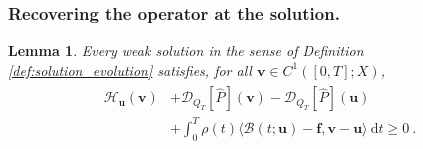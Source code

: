 \documentclass{article}
\newtheorem{lemma}[theorem]{Lemma}
\theoremstyle{definition}
\newcommand{\bfu}{\boldsymbol{u}}
\newcommand{\bfv}{\boldsymbol{v}}
\newcommand{\bff}{\boldsymbol{f}}
\newcommand{\D}{\mathcal{D}}
\newcommand{\dd}{\:\mathrm{d}}
\newcommand{\B}{\mathcal{B}}
\newcommand{\Hh}{\mathcal{H}}
\begin{document}
\subsubsection{Recovering the operator at the solution.}

\begin{lemma}\label{lem:wu-unshift}
Every weak solution in the sense of Definition \ref{def:solution_evolution}
satisfies, for all $\bfv\in C^1([0,T];X)$,
\begin{align}\label{eq:wu-unshifted}
    \begin{split}
    \Hh_{\bfu}(\bfv)&+\D_{Q_T}[\hat P](\bfv)-\D_{Q_T}[\hat P](\bfu)\\
    &+\int_0^T\rho(t)
       \langle\B(t;\bfu)-\bff,\bfv-\bfu\rangle\dd t\geq0\ .
    \end{split}
\end{align}
\end{lemma}
\end{document}
